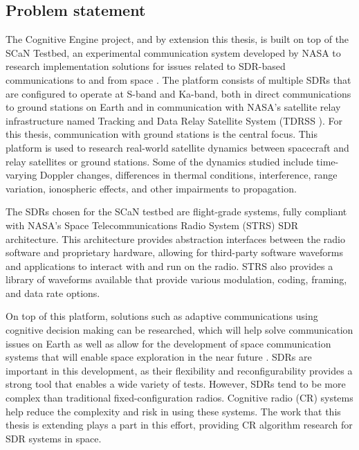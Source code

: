 	\subsection{Problem statement}
	\par The Cognitive Engine project, and by extension this thesis, is built on top of the SCaN Testbed, an experimental communication system developed by NASA to research implementation solutions for issues related to SDR-based communications to and from space \cite{placeholderCitation_pauloTim}. The platform consists of multiple SDRs that are configured to operate at S-band and Ka-band, both in direct communications to ground stations on Earth and in communication with NASA's satellite relay infrastructure named Tracking and Data Relay Satellite System (TDRSS \cite{placeholderCitation}). For this thesis, communication with ground stations is the central focus. This platform is used to research real-world satellite dynamics between spacecraft and relay satellites or ground stations. Some of the dynamics studied include time-varying Doppler changes, differences in thermal conditions, interference, range variation, ionospheric effects, and other impairments to propagation.
	\par The SDRs chosen for the SCaN testbed are flight-grade systems, fully compliant with NASA's Space Telecommunications Radio System (STRS)\cite{placeholderCitation} SDR architecture. This architecture provides abstraction interfaces between the radio software and proprietary hardware, allowing for third-party software waveforms and applications to interact with and run on the radio. 
	STRS also provides a library of waveforms available that provide various modulation, coding, framing, and data rate options. 
	\par On top of this platform, solutions such as adaptive communications using cognitive decision making can be researched, which will help solve communication issues on Earth as well as allow for the development of space communication systems that will enable space exploration in the near future \cite{paulo_cite_131}. SDRs are important in this development, as their flexibility and reconfigurability provides a strong tool that enables a wide variety of tests. However, SDRs tend to be more complex than traditional fixed-configuration radios. Cognitive radio (CR) systems help reduce the complexity and risk in using these systems. The work that this thesis is extending plays a part in this effort, providing CR algorithm research for SDR systems in space.    
